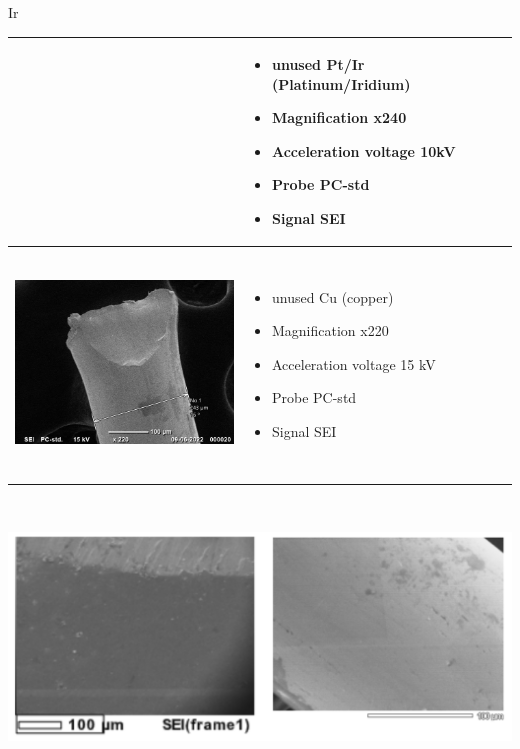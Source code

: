 Ir\documentclass{article}
\begin{document}
\begin{longtable}
\begin{tabular}{ | m{7cm} | m{7cm} | }
    &
      \begin{itemize}
        \item unused Pt/Ir (Platinum/Iridium)
        \item Magnification x240
        \item Acceleration voltage 10kV
        \item Probe PC-std
        \item Signal SEI
      \end{itemize} \\ \hline
    \begin{minipage}{.3\textwidth}
      \includegraphics[width=60mm, height=60mm]{pictures/ptir3.jpg}
    \end{minipage}
    &
      \begin{itemize}
        \item unused Cu (copper)
        \item Magnification x220
        \item Acceleration voltage 15 kV
        \item Probe PC-std
        \item Signal SEI
      \end{itemize} \\ \hline
 \end{tabular}
    \end{longtable}
\\
\begin{center}
\includegraphics[width=\textwidth,height=\textheight,keepaspectratio]{pictures/CU and PT.png}
\caption{Unused Cu and Pt/Ir}
\end{center}
\end{document}
